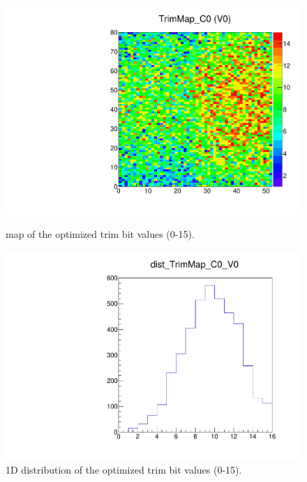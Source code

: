 
\begin{figure}[!htp]
\centering
\begin{minipage}{0.45\textwidth}
  \includegraphics[width=1.0\textwidth]{figures/trim_TrimMap.pdf}
  \caption{\roc map of the optimized trim bit values (0-15).}
  \label{fig:trim_TrimMap}
\end{minipage}
\hspace{0.3cm}
\begin{minipage}{0.45\textwidth}
  \includegraphics[width=1.0\textwidth]{figures/trim_dist_TrimMap.pdf}
  \caption{1D distribution of the optimized trim bit values (0-15).}
  \label{fig:trim_dist_TrimMap}
\end{minipage}
\end{figure}


